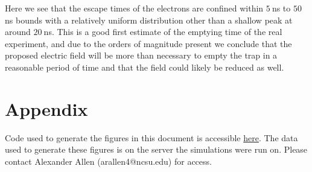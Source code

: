 \documentclass[12pt,letterpaper]{article}
\begin{document}
Here we see that the escape times of the electrons are confined within $5~$ns to $50~$ns bounds with a relatively uniform distribution other than a shallow peak at around $20~$ns. This is a good first estimate of the emptying time of the real experiment, and due to the orders of magnitude present we conclude that the proposed electric field will be more than necessary to empty the trap in a reasonable period of time and that the field could likely be reduced as well. 

\section{Appendix}

Code used to generate the figures in this document is accessible \href{https://github.ncsu.edu/arallen4/CRES/blob/master/ConstantField.xml}{here}. The data used to generate these figures is on the server the simulations were run on. Please contact Alexander Allen (arallen4@ncsu.edu) for access. 
\end{document}

